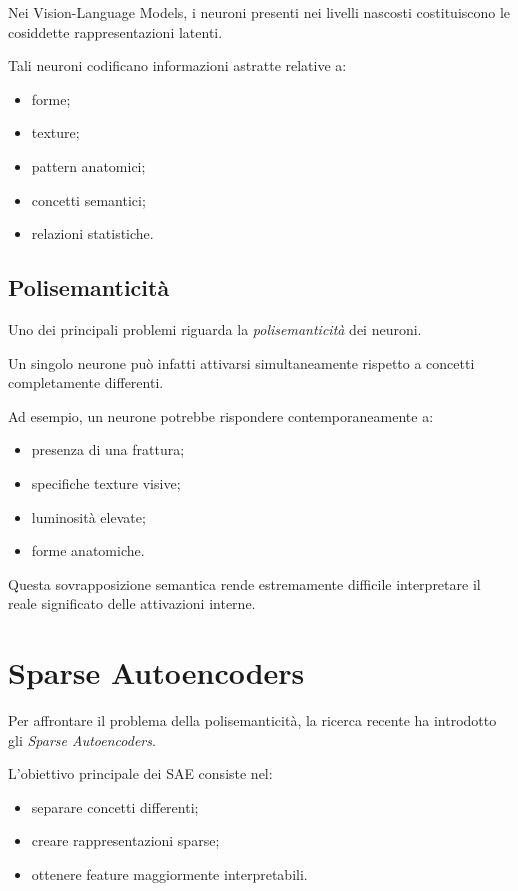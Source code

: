 Nei Vision-Language Models, i neuroni presenti nei livelli nascosti costituiscono le cosiddette rappresentazioni latenti.

Tali neuroni codificano informazioni astratte relative a:

\begin{itemize}
    \item forme;
    \item texture;
    \item pattern anatomici;
    \item concetti semantici;
    \item relazioni statistiche.
\end{itemize}

\subsection{Polisemanticità}

Uno dei principali problemi riguarda la \textit{polisemanticità} dei neuroni.

Un singolo neurone può infatti attivarsi simultaneamente rispetto a concetti completamente differenti.

Ad esempio, un neurone potrebbe rispondere contemporaneamente a:

\begin{itemize}
    \item presenza di una frattura;
    \item specifiche texture visive;
    \item luminosità elevate;
    \item forme anatomiche.
\end{itemize}

Questa sovrapposizione semantica rende estremamente difficile interpretare il reale significato delle attivazioni interne.

\section{Sparse Autoencoders}

Per affrontare il problema della polisemanticità, la ricerca recente ha introdotto gli \textit{Sparse Autoencoders}.

L'obiettivo principale dei SAE consiste nel:

\begin{itemize}
    \item separare concetti differenti;
    \item creare rappresentazioni sparse;
    \item ottenere feature maggiormente interpretabili.
\end{itemize}

